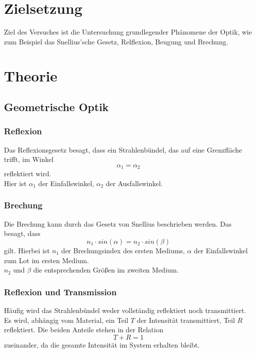 \section{Zielsetzung}
Ziel des Versuches ist die Untersuchung grundlegender Phänomene der Optik, wie zum Beispiel 
das Snellius'sche Gesetz, Relflexion, Beugung und Brechung.\\



\section{Theorie}
\label{sec:Theorie}
\subsection{Geometrische Optik}

\subsubsection*{Reflexion}
Das Reflexionsgesetz besagt, dass ein Strahlenbündel, das auf eine Grenzfläche trifft, im Winkel
\begin{equation*}
    \alpha_1 = \alpha_2
    \label{eq:teil1}
\end{equation*}
reflektiert wird.\\
Hier ist $\alpha_1$ der Einfallswinkel, $\alpha_2$ der Ausfallswinkel.\\

\subsubsection*{Brechung}
Die Brechung kann durch das Gesetz von Snellius beschrieben werden. Das besagt, dass
\begin{equation}
    n_1 \cdot sin(\alpha) = n_2 \cdot sin(\beta)
    \label{eq:teil2}
\end{equation}
gilt. Hierbei ist $n_1$ der Brechungsindex des ersten Mediums, $\alpha$ der Einfallswinkel zum Lot im ersten Medium.\\
$n_2$ und $\beta$ die entsprechenden Größen im zweiten Medium.\\


\subsubsection*{Reflexion und Transmission}
Häufig wird das Strahlenbündel weder vollständig reflektiert noch transmittiert.\\
Es wird, abhängig vom Material, ein Teil $T$ der Intensität transmittiert, Teil $R$ reflektiert. 
Die beiden Anteile stehen in der Relation \begin{equation*}
    T + R = 1
\end{equation*}
zueinander, da die gesamte Intensität im System erhalten bleibt.\\

